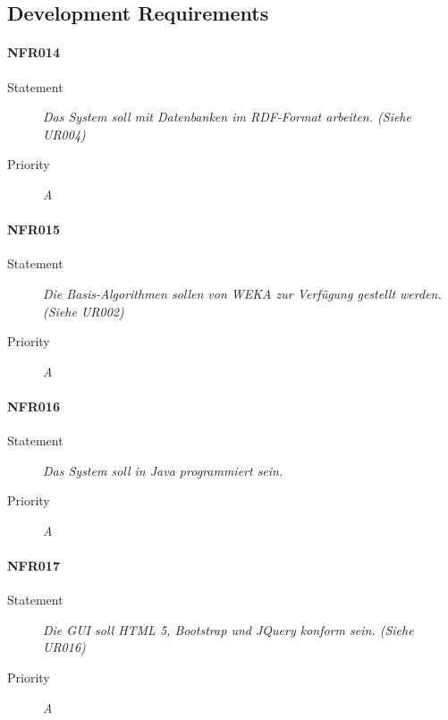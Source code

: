 \subsection{Development Requirements}

\paragraph{NFR014}
\begin{description}
\item [Statement] \textit{Das System soll mit Datenbanken im \gls{RDF}-Format arbeiten.
(Siehe UR004)}
\item [Priority] \textit{A}
\end{description}

\paragraph{NFR015}
\begin{description}
\item [Statement] \textit{Die Basis-Algorithmen sollen von \gls{WEKA} zur Verfügung gestellt werden.
(Siehe UR002)}
\item [Priority] \textit{A}
\end{description}

\paragraph{NFR016}
\begin{description}
\item [Statement] \textit{Das System soll in \gls{Java} programmiert sein.}
\item [Priority] \textit{A}
\end{description}

\paragraph{NFR017}
\begin{description}
\item [Statement] \textit{Die \gls{GUI} soll \gls{HTML} 5, \gls{Bootstrap} und \gls{JQuery} konform sein.
(Siehe UR016)}
\item [Priority] \textit{A}
\end{description}